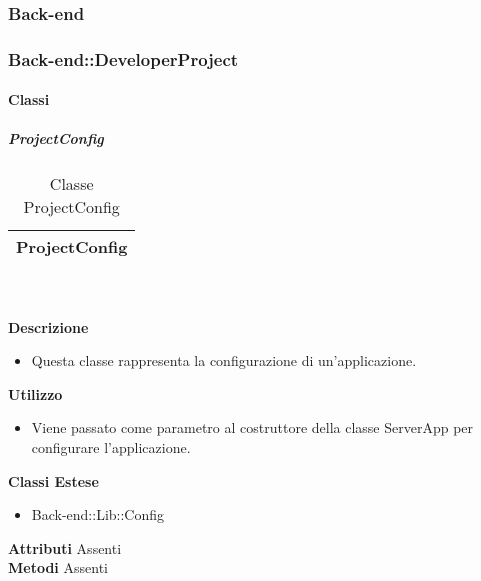 
	\subsubsection{Back-end} 
	\subsubsection{Back-end::DeveloperProject} 
		\paragraph{Classi}
			\subparagraph{ProjectConfig} 
\begin{table}[ht]
\begin{center}
\bgroup
	\setlength{\arrayrulewidth}{0.6mm}
	\def\arraystretch{1}
		\begin{tabular}{ | p{12cm} | }
				\hline  
					\centerline{\textbf{ProjectConfig}}
		\\ \hline 
				\hline
				\hline
		
		\end{tabular}
\egroup
\caption{Classe ProjectConfig}
\end{center}
\end{table} \textbf{\\ \\ Descrizione}
\begin{itemize}
\item[] Questa classe rappresenta la configurazione di un'applicazione.
\end{itemize} 
\textbf{Utilizzo}
\begin{itemize}
\item[] Viene passato come parametro al costruttore della classe ServerApp per configurare l'applicazione.
\end{itemize}
\textbf{Classi Estese}
\begin{itemize}
\item{Back-end::Lib::Config}
\end{itemize}
\textbf{Attributi}
Assenti \\
\textbf{Metodi}
Assenti \\


